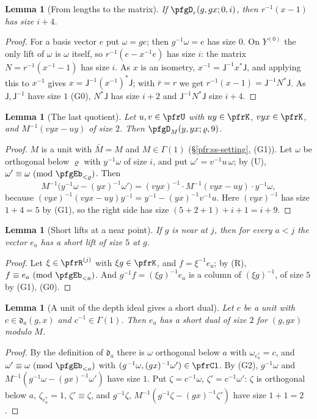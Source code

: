 \documentclass[10pt]{amsart}
\newtheorem{lemma}[theorem]{Lemma}
\theoremstyle{definition}
\theoremstyle{remark}
\begin{document}
\begin{lemma}[From lengths to the matrix]\label{pfg:matrix}
If $\pfgD_r(g,gx;0,i)$, then $r^{-1}(x-1)$ has size $i+4$.
\end{lemma}
\begin{proof}
For a basis vector $e$ put $\omega=ge$; then $g^{-1}\omega=e$ has size $0$. On $Y^{(0)}$ the only lift of $\omega$
is $\omega$ itself, so $r^{-1}(e-x^{-1}e)$ has size $i$: the matrix $N=r^{-1}(x^{-1}-1)$ has size $i$. As $x$ is
an isometry, $x^{-1}=\mathsf J^{-1}x^*\mathsf J$, and applying this to $x^{-1}$ gives
$x=\mathsf J^{-1}(x^{-1})^*\mathsf J$; with $\bar r=r$ we get $r^{-1}(x-1)=\mathsf J^{-1}N^*\mathsf J$. As
$\mathsf J,\mathsf J^{-1}$ have size $1$ (G0), $N^*\mathsf J$ has size $i+2$ and $\mathsf J^{-1}N^*\mathsf J$ size
$i+4$.
\end{proof}

\begin{lemma}[The last quotient]\label{pfg:top}
Let $u,v\in\pfrU$ with $uy\in\pfrK$, $vyx\in\pfrK$, and $M^{-1}(vyx-uy)$ of size $2$. Then
$\pfgD_M(y,yx;\varrho,9)$.
\end{lemma}
\begin{proof}
$M$ is a unit with $\bar M=M$ and $M\in\Gamma(1)$ (\S\ref{pfr:ss-setting}, (G1)). Let $\omega$ be orthogonal below
$\varrho$ with $y^{-1}\omega$ of size $i$, and put $\omega'=v^{-1}u\,\omega$; by (U),
$\omega'\equiv\omega\ (\mathrm{mod}\ \pfgEb_{<\varrho})$. Then
\[
M^{-1}\bigl(y^{-1}\omega-(yx)^{-1}\omega'\bigr)=(vyx)^{-1}\cdot M^{-1}(vyx-uy)\cdot y^{-1}\omega ,
\]
because $(vyx)^{-1}(vyx-uy)y^{-1}=y^{-1}-(yx)^{-1}v^{-1}u$. Here $(vyx)^{-1}$ has size $1+4=5$ by (G1), so the
right side has size $(5+2+1)+i+1=i+9$.
\end{proof}

\begin{lemma}[Short lifts at a near point]\label{pfg:lift}
If $g$ is near at $j$, then for every $a<j$ the vector $e_a$ has a short lift of size $5$ at $g$.
\end{lemma}
\begin{proof}
Let $\xi\in\pfrR^{(j)}$ with $\xi g\in\pfrK$, and $f=\xi^{-1}e_a$; by (R), $f\equiv e_a\ (\mathrm{mod}\
\pfgEb_{<a})$. And $g^{-1}f=(\xi g)^{-1}e_a$ is a column of $(\xi g)^{-1}$, of size $5$ by (G1), (G0).
\end{proof}

\begin{lemma}[A unit of the depth ideal gives a short dual]\label{pfg:dualunit}
Let $c$ be a unit with $c\in\mathfrak d_a(g,x)$ and $c^{-1}\in\Gamma(1)$. Then $e_a$ has a short dual of size
$2$ for $(g,gx)$ modulo $M$.
\end{lemma}
\begin{proof}
By the definition of $\mathfrak d_a$ there is $\omega$ orthogonal below $a$ with $\omega_{e^*_a}=c$, and
$\omega'\equiv\omega\ (\mathrm{mod}\ \pfgEb_{<a})$ with $(g^{-1}\omega,(gx)^{-1}\omega')\in\pfrCl$. By (G2),
$g^{-1}\omega$ and $M^{-1}(g^{-1}\omega-(gx)^{-1}\omega')$ have size $1$. Put $\zeta=c^{-1}\omega$, $\zeta'=c^{-1}\omega'$:
$\zeta$ is orthogonal below $a$, $\zeta_{e^*_a}=1$, $\zeta'\equiv\zeta$, and $g^{-1}\zeta$,
$M^{-1}(g^{-1}\zeta-(gx)^{-1}\zeta')$ have size $1+1=2$.
\end{proof}
\end{document}
